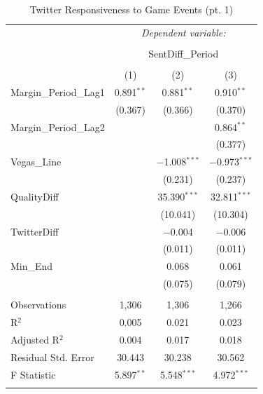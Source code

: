 \documentclass[12pt]{article}
\begin{document}
\begin{doublespacing}
\begin{table}[H] 
\centering 
\caption{Twitter Responsiveness to Game Events (pt. 1)}\label{table:sentresponsiveness} 
\begin{tabular*}{\textwidth}{@{\extracolsep{\fill}}lccc} 
\hline 
\hline
 & \multicolumn{3}{c}{\textit{Dependent variable:}} \\ 
\cline{2-4} 
\\[-3.0ex] & \multicolumn{3}{c}{SentDiff\_Period} \\ 
\\[-1.5ex] & (1) & (2) & (3)\\ 
\hline
 Margin\_Period\_Lag1 & 0.891$^{**}$ & 0.881$^{**}$ & 0.910$^{**}$ \\ 
  & (0.367) & (0.366) & (0.370) \\ 
 Margin\_Period\_Lag2 &  &  & 0.864$^{**}$ \\ 
  &  &  & (0.377) \\ 
 Vegas\_Line &  & $-$1.008$^{***}$ & $-$0.973$^{***}$ \\ 
  &  & (0.231) & (0.237) \\ 
 QualityDiff &  & 35.390$^{***}$ & 32.811$^{***}$ \\ 
  &  & (10.041) & (10.304) \\ 
 TwitterDiff &  & $-$0.004 & $-$0.006 \\ 
  &  & (0.011) & (0.011) \\ 
 Min\_End &  & 0.068 & 0.061 \\ 
  &  & (0.075) & (0.079) \\ 
\hline \\[-1.8ex] 
Observations & 1,306 & 1,306 & 1,266 \\ 
R$^{2}$ & 0.005 & 0.021 & 0.023 \\ 
Adjusted R$^{2}$ & 0.004 & 0.017 & 0.018 \\ 
Residual Std. Error & 30.443 & 30.238 & 30.562 \\ 
F Statistic & 5.897$^{**}$ & 5.548$^{***}$ & 4.972$^{***}$ \\ 
\hline 
\hline \\[-1.8ex] 
\end{tabular*} 
\end{table} 


\end{doublespacing}
\end{document}
